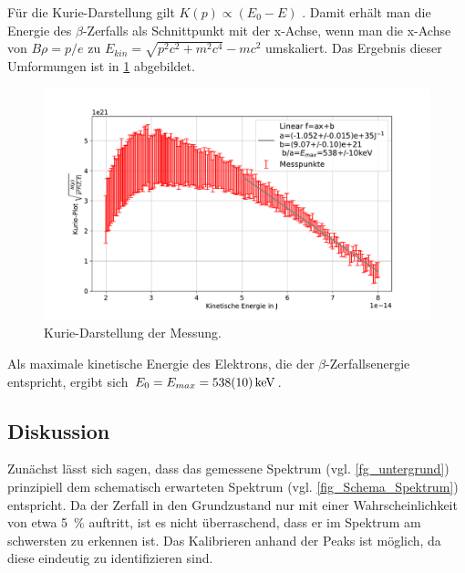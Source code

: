 \documentclass[
	a4paper,
	12pt,
	pagesize,
	ngerman
]{scrartcl}
\begin{document}
	Für die Kurie-Darstellung gilt $K(p)\propto (E_0-E)$ \cite{Anleitung}.
	Damit erhält man die Energie des $\beta$-Zerfalls als Schnittpunkt mit der x-Achse, wenn man die x-Achse von $B\rho=p/e$ zu $E_{kin}=\sqrt{p^2c^2+m^2c^4}-mc^2$ umskaliert.
	Das Ergebnis dieser Umformungen ist in \cref{fg_kurie} abgebildet.
	\begin{figure}[H]
			\includegraphics[width=  \linewidth]{img/kurie}
			\caption{
			Kurie-Darstellung der Messung.
			}
			\label{fg_kurie}
	\end{figure}
	Als maximale kinetische Energie des Elektrons, die der $\beta$-Zerfallsenergie entspricht, ergibt sich $E_0=E_{max}=\SI{538+-10}{keV}$.
	\subsection{Diskussion}
	Zunächst lässt sich sagen, dass das gemessene Spektrum (vgl. \cref{fg_untergrund}) prinzipiell dem schematisch erwarteten Spektrum (vgl. \cref{fig_Schema_Spektrum}) entspricht.
	Da der Zerfall in den Grundzustand nur mit einer Wahrscheinlichkeit von etwa \SI{5}{\percent} auftritt, ist es nicht überraschend, dass er im Spektrum am schwersten zu erkennen ist.
	Das Kalibrieren anhand der Peaks ist möglich, da diese eindeutig zu identifizieren sind.
\end{document}
